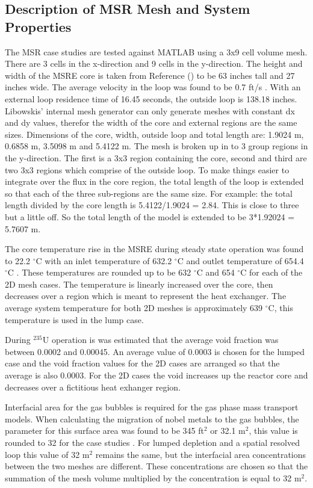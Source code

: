 \subsection{Description of MSR Mesh and System Properties}
The MSR case studies are tested against MATLAB using a 3x9 cell volume mesh. There are 3 cells in the x-direction and 9 cells in the y-direction. The height and width of the MSRE core is taken from Reference (\cite{haubenreich1964}) to be 63 inches tall and 27 inches wide. The average velocity in the loop was found to be 0.7 ft/s \cite{kedl1972}. With an external loop residence time of 16.45 seconds, the outside loop is 138.18 inches. Libowskis' internal mesh generator can only generate meshes with constant dx and dy values, therefor the width of the core and external regions are the same sizes. Dimensions of the core, width, outside loop and total length are: 1.9024 m, 0.6858 m, 3.5098 m and 5.4122 m. The mesh is broken up in to 3 group regions in the y-direction. The first is a 3x3 region containing the core, second and third are two 3x3 regions which comprise of the outside loop. To make things easier to integrate over the flux in the core region, the total length of the loop is extended so that each of the three sub-regions are the same size. For example: the total length divided by the core length is 5.4122/1.9024 = 2.84. This is close to three but a little off. So the total length of the model is extended to be 3*1.92024 = 5.7607 m. 

The core temperature rise in the MSRE during steady state operation was found to 22.2 $^{\circ}$C with an inlet temperature of 632.2 $^{\circ}$C and outlet temperature of 654.4 $^{\circ}$C \cite{engel1962}. These temperatures are rounded up to be 632 $^{\circ}$C and 654 $^{\circ}$C for each of the 2D mesh cases. The temperature is linearly increased over the core, then decreases over a region which is meant to represent the heat exchanger. The average system temperature for both 2D meshes is approximately 639 $^{\circ}$C, this temperature is used in the lump case. 

During $^{235}$U operation is was estimated that the average void fraction was between 0.0002 and 0.00045. An average value of 0.0003 is chosen for the lumped case and the void fraction values for the 2D cases are arranged so that the average is also 0.0003. For the 2D cases the void increases up the reactor core and decreases over a fictitious heat exhanger region.

Interfacial area for the gas bubbles is required for the gas phase mass transport models. When calculating the migration of nobel metals to the gas bubbles, the parameter for this surface area was found to be 345 ft$^{2}$ or 32.1 m$^{2}$, this value is rounded to 32 for the case studies \cite{kedl1972}. For lumped depletion and a spatial resolved loop this value of 32 m$^{2}$ remains the same, but the interfacial area concentrations between the two meshes are different. These concentrations are chosen so that the summation of the mesh volume multiplied by the concentration is equal to 32 m$^{2}$. 

